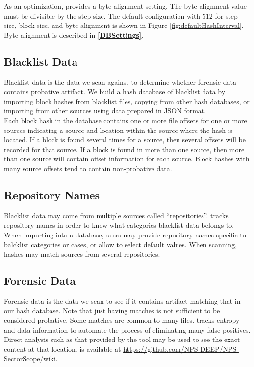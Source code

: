 \documentclass[11pt,fleqn]{article} %
\begin{document}
As an optimization, \hdb provides a byte alignment setting. The byte alignment value must be divisible by the step size. The default configuration with 512 for step size, block size, and byte alignment is shown in Figure \ref{fig:defaultHashInterval}. Byte alignment is described in \textbf{\autoref{DBSettings}}.\\

\subsection{Blacklist Data}
Blacklist data is the data we scan against to determine whether forensic data
contains probative artifact.
We build a hash database of blacklist data by importing block hashes
from blacklist files, copying from other hash databases,
or importing from other sources using data prepared in JSON format.\\

Each block hash in the database contains one or more file offsets for one or more sources indicating a source and location within the source where the hash is located.  If a block is found several times for a source, then several offsets will be recorded for that source. If a block is found in more than one source, then more than one source will contain offset information for each source. Block hashes with many source offsets tend to contain non-probative data.\\

\subsection{Repository Names}
Blacklist data may come from multiple sources called ``repositories''. \hdb tracks repository names in order to know what categories blacklist data belongs to. When importing into a database, users may provide repository names specific to balcklist categories or cases, or allow \hdb to select default values.  When scanning, hashes may match sources from several repositories.\\

\subsection{Forensic Data}
Forensic data is the data we scan to see if it contains artifact matching
that in our hash database.
Note that just having matches is not sufficient to be considered probative.
Some matches are common to many files.
\hdb tracks entropy and data information to automate the process
of eliminating many false positives.
Direct analysis such as that provided by the \sscope tool
may be used to see the exact content at that location.
\sscope is available at \url{https://github.com/NPS-DEEP/NPS-SectorScope/wiki}.
\end{document}
